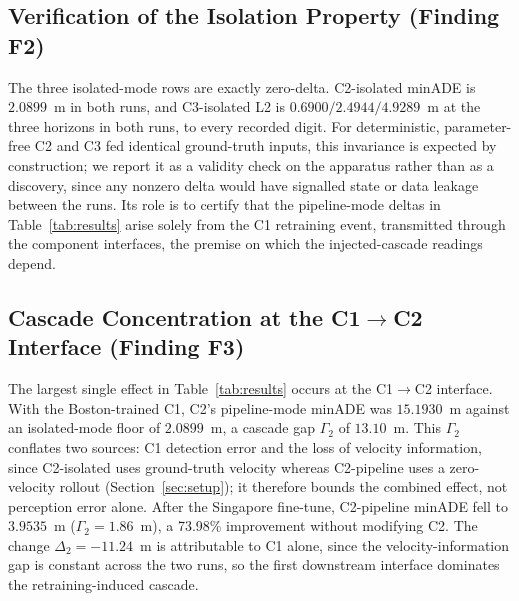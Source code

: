 \documentclass[conference]{IEEEtran}
\begin{document}
\subsection{Verification of the Isolation Property (Finding F2)}
The three isolated-mode rows are exactly zero-delta. C2-isolated minADE is
$2.0899$~m in both runs, and C3-isolated L2 is $0.6900 / 2.4944 / 4.9289$~m at
the three horizons in both runs, to every recorded digit. For deterministic,
parameter-free C2 and C3 fed identical ground-truth inputs, this invariance is
expected by construction; we report it as a validity check on the apparatus
rather than as a discovery, since any nonzero delta would have signalled state
or data leakage between the runs. Its role is to certify that the pipeline-mode
deltas in Table~\ref{tab:results} arise solely from the C1 retraining event,
transmitted through the component interfaces, the premise on which the
injected-cascade readings depend.

\subsection{Cascade Concentration at the C1$\to$C2 Interface (Finding F3)}
The largest single effect in Table~\ref{tab:results} occurs at the C1$\to$C2
interface. With the Boston-trained C1, C2's pipeline-mode minADE was
$15.1930$~m against an isolated-mode floor of $2.0899$~m, a cascade gap
$\Gamma_2$ of $13.10$~m. This $\Gamma_2$ conflates two sources: C1 detection
error and the loss of velocity information, since C2-isolated uses ground-truth
velocity whereas C2-pipeline uses a zero-velocity rollout
(Section~\ref{sec:setup}); it therefore bounds the combined effect, not
perception error alone. After the Singapore fine-tune, C2-pipeline minADE fell
to $3.9535$~m ($\Gamma_2 = 1.86$~m), a 73.98\% improvement without modifying
C2. The change $\Delta_2 = -11.24$~m is attributable to C1 alone, since the
velocity-information gap is constant across the two runs, so the first
downstream interface dominates the retraining-induced cascade.
\end{document}
